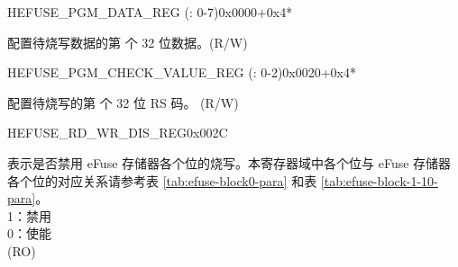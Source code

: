 \begin{register}{H}{EFUSE\_PGM\_DATA\_REG (: 0-7)}{0x0000+0x4*}\label{regdesc:EFUSEPGMDATANREG}
%
\regnewline%
\begin{regdesc}\begin{reglist}
\label{fielddesc:EFUSEPGMDATAN}\item [EFUSE\_PGM\_DATA\_\regindex{n}] 配置待烧写数据的第  个 32 位数据。(R/W)
\end{reglist}\end{regdesc}
\end{register}


\begin{register}{H}{EFUSE\_PGM\_CHECK\_VALUE\_REG (: 0-2)}{0x0020+0x4*}\label{regdesc:EFUSEPGMCHECKVALUENREG}
%
\regnewline%
\begin{regdesc}\begin{reglist}
\label{fielddesc:EFUSEPGMRSDATAN}\item [EFUSE\_PGM\_RS\_DATA\_\regindex{n}] 配置待烧写的第  个 32 位 RS 码。 (R/W)
\end{reglist}\end{regdesc}
\end{register}


\begin{register}{H}{EFUSE\_RD\_WR\_DIS\_REG}{0x002C}\label{regdesc:EFUSERDWRDISREG}
%
\regnewline%
\begin{regdesc}\begin{reglist}
\label{fielddesc:EFUSEWRDIS}\item [EFUSE\_WR\_DIS] 表示是否禁用 eFuse 存储器各个位的烧写。本寄存器域中各个位与 eFuse 存储器各个位的对应关系请参考表 \ref{tab:efuse-block0-para} 和表 \ref{tab:efuse-block-1-10-para}。\\
1：禁用\\
0：使能\\
(RO)
\end{reglist}\end{regdesc}
\end{register}


